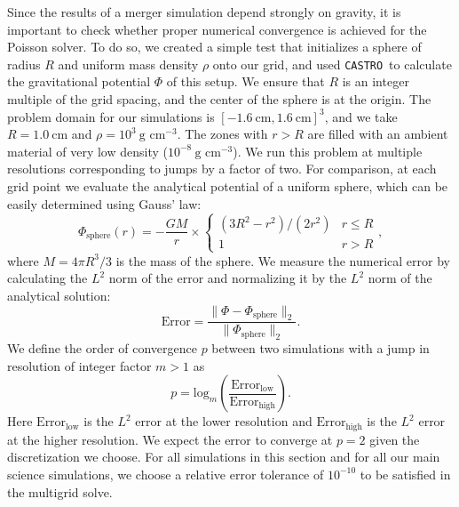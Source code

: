 \documentclass[iop,numberedappendix]{../emulateapj}
\newcommand{\castro}{\texttt{CASTRO}}
\begin{document}
Since the results of a merger simulation depend strongly on gravity,
it is important to check whether proper numerical convergence is
achieved for the Poisson solver. To do so, we created a simple test
that initializes a sphere of radius $R$ and uniform mass density $\rho$
onto our grid, and used \castro\ to calculate the gravitational
potential $\Phi$ of this setup. We ensure that $R$ is an integer
multiple of the grid spacing, and the center of the sphere is at the
origin. The problem domain for our simulations is $[-1.6\ \text{cm}, 1.6\ \text{cm}]^3$, and
we take $R = 1.0\ \text{cm}$ and $\rho = 10^3\ \text{g cm}^{-3}$. 
The zones with $r > R$ are filled with an ambient material of very low density 
($10^{-8}\ \text{g cm}^{-3}$). We run this problem at multiple 
resolutions corresponding to jumps by a factor of two. For
comparison, at each grid point we evaluate the analytical potential of
a uniform sphere, which can be easily determined using Gauss' law:
\begin{equation}
  \Phi_{\text{sphere}}(r) = -\frac{GM}{r} \times \begin{cases} (3R^2 - r^2)/(2 r^2) & r \leq R \\ 1 & r > R \end{cases},\label{eq:sphere-analytical}
\end{equation}
where $M = 4\pi R^3 / 3$ is the mass of the sphere. We measure the 
numerical error by calculating the $L^2$ norm of the error and 
normalizing it by the $L^2$ norm of the analytical solution:
\begin{equation}
  \text{Error} = \frac{\|\Phi - \Phi_{\text{sphere}}\|_2}{\|\Phi_{\text{sphere}}\|_2}.
\end{equation}
We define the order of convergence $p$ between two simulations with a jump 
in resolution of integer factor $m > 1$ as
\begin{equation}
  p = \text{log}_{m}\left(\frac{\text{Error}_{\text{low}}}{\text{Error}_{\text{high}}}\right).
\end{equation}
Here $\text{Error}_{\text{low}}$ is the $L^2$ error at the lower resolution 
and $\text{Error}_{\text{high}}$ is the $L^2$ error at the higher resolution.
We expect the error to converge at $p = 2$ given the discretization we choose. 
For all simulations in this section and for all our main science simulations,
we choose a relative error tolerance of $10^{-10}$ to be satisfied in the multigrid solve.
\end{document}
